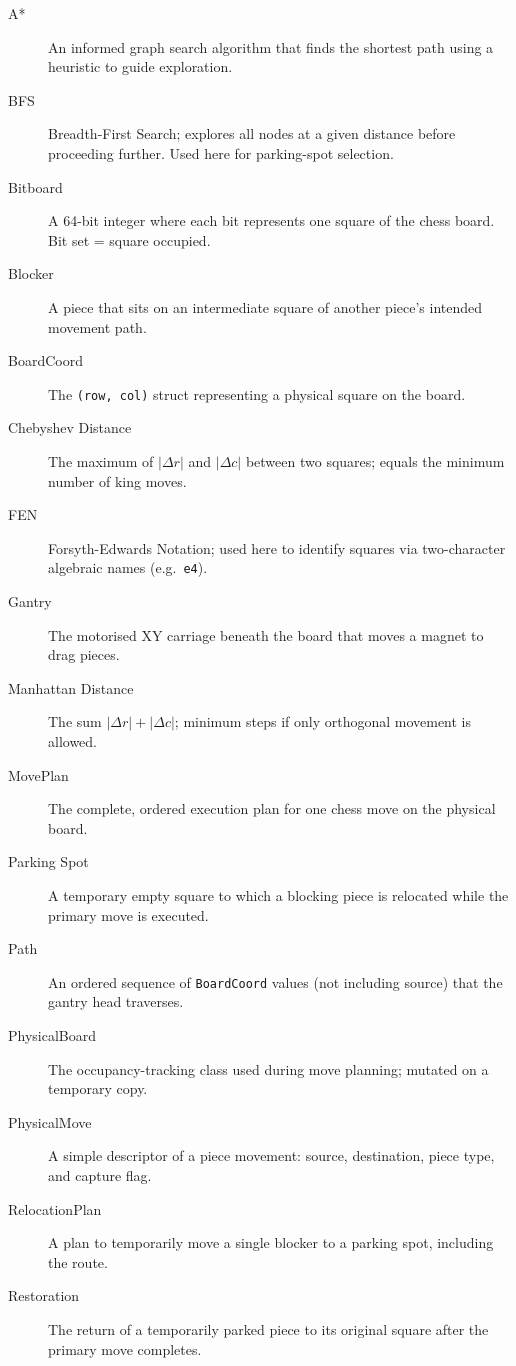 \documentclass[11pt,a4paper]{report}
\begin{document}
\begin{description}
    \item[A*] An informed graph search algorithm that finds the shortest path using a heuristic to guide exploration.
    \item[BFS] Breadth-First Search; explores all nodes at a given distance before proceeding further. Used here for parking-spot selection.
    \item[Bitboard] A 64-bit integer where each bit represents one square of the chess board. Bit set = square occupied.
    \item[Blocker] A piece that sits on an intermediate square of another piece's intended movement path.
    \item[BoardCoord] The \texttt{(row, col)} struct representing a physical square on the board.
    \item[Chebyshev Distance] The maximum of $|\Delta r|$ and $|\Delta c|$ between two squares; equals the minimum number of king moves.
    \item[FEN] Forsyth-Edwards Notation; used here to identify squares via two-character algebraic names (e.g.\ \texttt{e4}).
    \item[Gantry] The motorised XY carriage beneath the board that moves a magnet to drag pieces.
    \item[Manhattan Distance] The sum $|\Delta r| + |\Delta c|$; minimum steps if only orthogonal movement is allowed.
    \item[MovePlan] The complete, ordered execution plan for one chess move on the physical board.
    \item[Parking Spot] A temporary empty square to which a blocking piece is relocated while the primary move is executed.
    \item[Path] An ordered sequence of \texttt{BoardCoord} values (not including source) that the gantry head traverses.
    \item[PhysicalBoard] The occupancy-tracking class used during move planning; mutated on a temporary copy.
    \item[PhysicalMove] A simple descriptor of a piece movement: source, destination, piece type, and capture flag.
    \item[RelocationPlan] A plan to temporarily move a single blocker to a parking spot, including the route.
    \item[Restoration] The return of a temporarily parked piece to its original square after the primary move completes.
\end{description}
\end{document}
